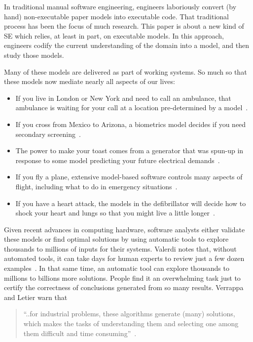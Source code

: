 \documentclass[10pt,journal,compsoc]{IEEEtran}
\newcommand{\bi}{\begin{itemize}}
\newcommand{\ei}{\end{itemize}}
\newcommand{\ADD}[1]{#1}
\begin{document}
In  traditional manual software engineering, engineers laboriously convert (by hand) non-executable paper models into executable code. 
That traditional process has been the focus of much research.  
This paper is about a new kind of SE which relies, at least in part, on executable models. 
In this approach, engineers codify the current understanding of the domain into a model, and then study those models.

Many of these models are delivered as part of working systems.
So much so that these models now
  mediate nearly all aspects of our lives:
\bi
\item If you
  live in London or New York and need to call an
  ambulance, that ambulance is waiting for your call
  at a location pre-determined by a model~\cite{veer11}. 
\item
If you cross from Mexico to Arizona,
a biometrics model  decides if you need
secondary screening~\cite{Sacanamboy09}.
\item
 The power to make your toast comes from a
  generator that was spun-up in response
  to some model predicting your future electrical
  demands~\cite{808235}.  
\item
If you fly a plane, extensive
  model-based software controls many aspects of
  flight, including what to do in emergency
  situations~\cite{Kim2011}. \item
If you have a heart attack, the
   models in the defibrillator will
  decide how to shock your heart and lungs so that
  you might live a little longer~\cite{kamp99}.
\ei

\ADD{Given recent advances in computing hardware}, software analysts either validate these models or find optimal solutions by using automatic tools to explore thousands to millions of inputs for their systems. 
Valerdi notes that, without automated tools, it can take days for human experts to review just a few dozen examples~\cite{valerdi11}.  
In that same time, an automatic tool can explore thousands to millions to billions more solutions.  
People find it an overwhelming task just to certify the correctness of conclusions generated from so many results. 
Verrappa and Letier warn that
\begin{quote}
``..for industrial problems, these algorithms generate
(many) solutions, which makes the tasks of
understanding them and selecting one among them
difficult and time consuming''~\cite{veer11}.
\end{quote}
\end{document}
